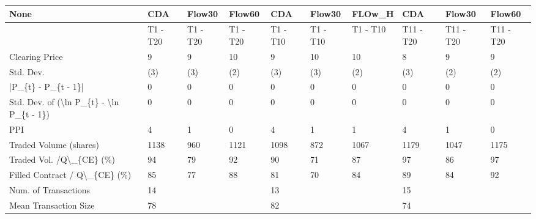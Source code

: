 \begin{tabular}{llllllllll}
\hline
 None                                                      & CDA      & Flow30   & Flow60   & CDA      & Flow30   & FLOw\_H   & CDA       & Flow30    & Flow60    \\
\hline
                                                           & T1 - T20 & T1 - T20 & T1 - T20 & T1 - T10 & T1 - T10 & T1 - T10 & T11 - T20 & T11 - T20 & T11 - T20 \\
 Clearing Price                                            & 9        & 9        & 10       & 9        & 10       & 10       & 8         & 9         & 9         \\
 Std. Dev.                                                 & (3)      & (3)      & (2)      & (3)      & (3)      & (2)      & (3)       & (2)       & (2)       \\
 |P\_\{t\} - P\_\{t - 1\}|                                       & 0        & 0        & 0        & 0        & 0        & 0        & 0         & 0         & 0         \\
 Std. Dev. of (\textbackslash{}ln P\_\{t\} - \textbackslash{}ln P\_\{t - 1\})                  & 0        & 0        & 0        & 0        & 0        & 0        & 0         & 0         & 0         \\
 PPI                                                       & 4        & 1        & 0        & 4        & 1        & 1        & 4         & 1         & 0         \\
 Traded Volume (shares)                                    & 1138     & 960      & 1121     & 1098     & 872      & 1067     & 1179      & 1047      & 1175      \\
 Traded Vol. /Q\textbackslash{}\_\{CE\} (\%)                                  & 94       & 79       & 92       & 90       & 71       & 87       & 97        & 86        & 97        \\
 Filled Contract / Q\textbackslash{}\_\{CE\} (\%)                             & 85       & 77       & 88       & 81       & 70       & 84       & 89        & 84        & 92        \\
 Num. of Transactions                                      & 14       &          &          & 13       &          &          & 15        &           &           \\
 Mean Transaction Size                                     & 78       &          &          & 82       &          &          & 74        &           &           \\

\end{tabular}
